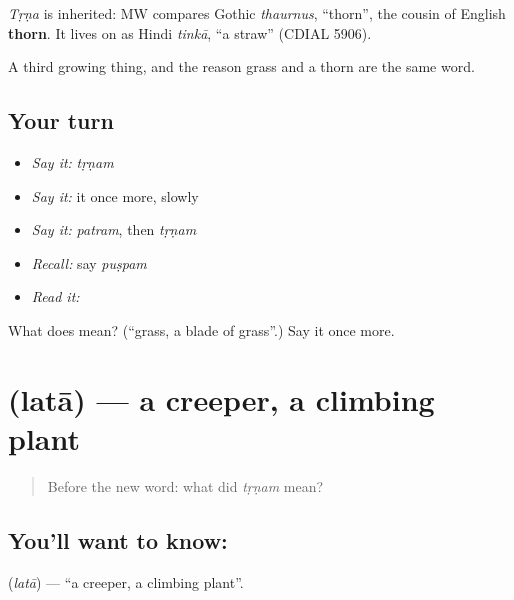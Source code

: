\begin{cousinweb}
\emph{Tṛṇa} is inherited: MW compares Gothic \emph{thaurnus}, \textquotedblleft{}thorn\textquotedblright{}, the cousin of English \textbf{thorn}. It lives on as Hindi \emph{tinkā}, \textquotedblleft{}a straw\textquotedblright{} (CDIAL 5906).
\end{cousinweb}

\begin{grammarlens}[title={What you've built}]
A third growing thing, and the reason grass and a thorn are the same word.
\end{grammarlens}

\subsection*{Your turn}
\begin{itemize}
\raggedright
  \item \emph{Say it:} \emph{tṛṇam}
  \item \emph{Say it:} it once more, slowly
  \item \emph{Say it:} \emph{patram}, then \emph{tṛṇam}
  \item \emph{Recall:} say \emph{puṣpam}
  \item \emph{Read it:} \textbf{}
\end{itemize}

\begin{tcolorbox}[breakable,colback=teal!4,colframe=teal!35!black,title={Before you move on}]
What does  mean? (\textquotedblleft{}grass, a blade of grass\textquotedblright{}.) Say it once more.
\end{tcolorbox}
\section[\texorpdfstring{\sk{लता} (latā)}{लता (latā)}]{ (latā) — a creeper, a climbing plant}

\label{lesson:SA-C32-vine}



\begin{quote}
Before the new word: what did \emph{tṛṇam} mean?
\end{quote}

\subsection*{You'll want to know: }
\textbf{} (\emph{latā}) — \textquotedblleft{}a creeper, a climbing plant\textquotedblright{}.

